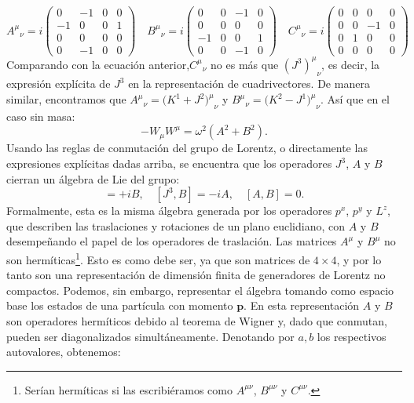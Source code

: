 \documentclass[a4paper,11pt]{book} %
\begin{document}
\begin{equation}
{A^{\mu}}_{\nu}=i\begin{pmatrix}0&-1&0&0\\ -1&0&0&1\\ 0&0&0&0\\ 0&-1&0&0\end{pmatrix}
\quad
{B^{\mu}}_{\nu}=i\begin{pmatrix}0&0&-1&0\\ 0&0&0&0\\ -1&0&0&1\\ 0&0&-1&0\end{pmatrix}
\quad
{C^{\mu}}_{\nu}=i\begin{pmatrix}0&0&0&0\\ 0&0&-1&0\\ 0&1&0&0\\ 0&0&0&0\end{pmatrix}
\end{equation}
\noindent
Comparando con la ecuación anterior,${C^{\mu}}_{\nu}$ no es más que ${(J^{3})^{\mu}}_{\nu}$, es decir, la expresión explícita de $J^{3}$ en la representación de cuadrivectores. De manera similar, encontramos que ${A^{\mu}}_{\nu}=(K^{1}+{J^{2})^{\mu}}_{\nu}$ y ${B^{\mu}}_{\nu}=(K^{2}-{J^{1})^{\mu}}_{\nu}$. Así que en el caso sin masa:
\begin{equation}
-W_{\mu}W^{\mu}=\omega^{2}(A^{2}+B^{2}).
\end{equation} %
\noindent
Usando las reglas de conmutación del grupo de Lorentz, o directamente las expresiones explícitas dadas arriba, se encuentra que los operadores $J^{3}$, $A$ y $B$ cierran un álgebra de Lie del grupo:
\begin{equation}
[J^{3},A]=+iB, \quad [J^{3},B]=-iA, \quad [A,B]=0.
\end{equation} 
Formalmente, esta es la misma álgebra generada por los operadores $p^{x}$, $p^{y}$ y $L^{z}$, que describen las traslaciones y rotaciones de un plano euclidiano, con $A$ y $B$ desempeñando el papel de los operadores de traslación.
\medskip\newline
Las matrices $A^{\mu}$ y $B^{\mu}$ no son hermíticas\footnote{Serían hermíticas si las escribiéramos como $A^{\mu\nu}$, $B^{\mu\nu}$ y $C^{\mu\nu}$.}. Esto es como debe ser, ya que son matrices de $4\times4$, y por lo tanto son una representación de dimensión finita de generadores de Lorentz no compactos.
\medskip\newline
Podemos, sin embargo, representar el álgebra tomando como espacio base los estados de una partícula con momento $\mathbf{p}$. En esta representación $A$ y $B$ son operadores hermíticos debido al teorema de Wigner y, dado que conmutan, pueden ser diagonalizados simultáneamente. Denotando por $a, b$ los respectivos autovalores, obtenemos:
\end{document}
